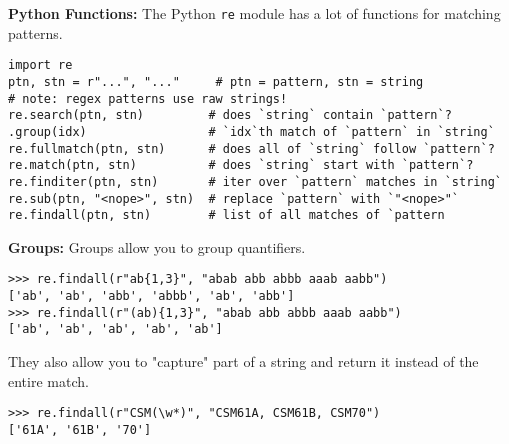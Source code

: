 \textbf{Python Functions:}
The Python \lstinline$re$ module has a lot of functions for matching patterns.

\begin{lstlisting}
import re
ptn, stn = r"...", "..."     # ptn = pattern, stn = string
# note: regex patterns use raw strings!
re.search(ptn, stn)         # does `string` contain `pattern`?
.group(idx)                 # `idx`th match of `pattern` in `string`
re.fullmatch(ptn, stn)      # does all of `string` follow `pattern`?
re.match(ptn, stn)          # does `string` start with `pattern`?
re.finditer(ptn, stn)       # iter over `pattern` matches in `string`
re.sub(ptn, "<nope>", stn)  # replace `pattern` with `"<nope>"`
re.findall(ptn, stn)        # list of all matches of `pattern
\end{lstlisting}

\textbf{Groups:}
Groups allow you to group quantifiers.
\begin{lstlisting}
>>> re.findall(r"ab{1,3}", "abab abb abbb aaab aabb")
['ab', 'ab', 'abb', 'abbb', 'ab', 'abb']
>>> re.findall(r"(ab){1,3}", "abab abb abbb aaab aabb")
['ab', 'ab', 'ab', 'ab', 'ab']
\end{lstlisting}
They also allow you to "capture" part of a string and return it instead of the entire match.
\begin{lstlisting}
>>> re.findall(r"CSM(\w*)", "CSM61A, CSM61B, CSM70")
['61A', '61B', '70']
\end{lstlisting}

